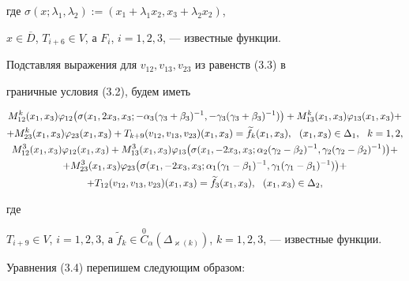 где $\sigma (x;\lambda_1,\lambda_2):=(x_1+\lambda_1 x_2,x_3+\lambda_2 x_2)$,


$x\in \overline D$, $T_{i+6}\in V$, а $F_i$, $i=1,2,3$, --- известные функции.


Подставляя выражения для $v_{12}, v_{13}, v_{23}$ из равенств (3.3) в


граничные условия (3.2), будем иметь




\begin{gather}


M_{12}^k(x_1,x_3)\varphi_{12}\big(\sigma(x_1,2x_3,x_3;-\alpha_3(\gamma_3+


\beta_3)^{-1},-\gamma_3(\gamma_3+\beta_3)^{-1})\big)+M_{13}^k(x_1,x_3)


\varphi_{13}(x_1,x_3)+\notag\\


%


+M_{23}^k(x_1,x_3)\varphi_{23}(x_1,x_3)+T_{k+9}(v_{12},v_{13},v_{23})(x_1,x_3)


=\widetilde f_k(x_1,x_3),\ \ (x_1,x_3)\in\Delta_1,\ \ k=1,2, \\


%




M_{12}^3(x_1,x_3)\varphi_{12}(x_1,x_3)+M_{13}^3(x_1,x_3)\varphi_{13}


\big(\sigma(x_1,-2x_3,x_3;\alpha_2(\gamma_2-\beta_2)^{-1},\gamma_2(\gamma_2-


\beta_2)^{-1})\big)+\notag \\


+M_{23}^3(x_1,x_3)\varphi_{23}\big(\sigma(x_1,-2x_3,x_3;\alpha_1(\gamma_1-


\beta_1)^{-1},\gamma_1(\gamma_1-\beta_1)^{-1})\big)+\notag\\


+T_{12}(v_{12},v_{13},v_{23})(x_1,x_3)=\widetilde f_3(x_1,x_3),\ \ (x_1,x_3)


\in \Delta_2,


\end{gather}


где


$T_{i+9}\in V$, $i=1,2,3$, а $\widetilde f_k \in \overset{0}{C}_{\alpha}(


\Delta_{\varkappa(k)})$, $k=1,2,3$, --- известные функции.


Уравнения (3.4) перепишем следующим образом:





